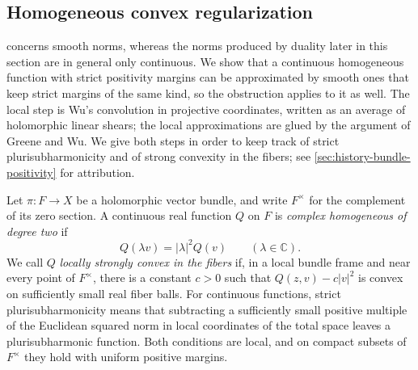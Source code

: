 \subsection{Homogeneous convex regularization}
\label{subsec:homogeneous-convex-regularization}

 concerns smooth norms, whereas the norms produced by duality later in this section are in general only continuous. We show that a continuous homogeneous function with strict positivity margins can be approximated by smooth ones that keep strict margins of the same kind, so the obstruction applies to it as well. The local step is Wu's convolution in projective coordinates, written as an average of holomorphic linear shears; the local approximations are glued by the argument of Greene and Wu. We give both steps in order to keep track of strict plurisubharmonicity and of strong convexity in the fibers; see \cref{sec:history-bundle-positivity} for attribution.

Let $\pi\colon F\to X$ be a holomorphic vector bundle, and write $F^\times$ for the complement of its zero section. A continuous real function $Q$ on $F$ is \emph{complex homogeneous of degree two} if
\[
 Q(\lambda v)=|\lambda|^2Q(v)\qquad(\lambda\in\mathbb C).
\]
We call $Q$ \emph{locally strongly convex in the fibers} if, in a local bundle frame and near every point of $F^\times$, there is a constant $c>0$ such that $Q(z,v)-c|v|^2$ is convex on sufficiently small real fiber balls. For continuous functions, strict plurisubharmonicity means that subtracting a sufficiently small positive multiple of the Euclidean squared norm in local coordinates of the total space leaves a plurisubharmonic function. Both conditions are local, and on compact subsets of $F^\times$ they hold with uniform positive margins.



